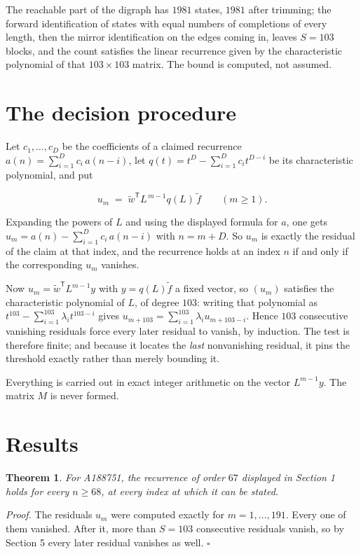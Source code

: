 \documentclass[11pt]{article}
\newtheorem{theorem}{Theorem}
\theoremstyle{definition}
\begin{document}
The reachable part of the digraph has $1981$ states, $1981$ after trimming; the forward identification of states with equal numbers of completions of every length, then the mirror identification on the edges coming in, leaves $S = 103$ blocks, and the count satisfies the linear recurrence given by the characteristic polynomial of that $103\times103$ matrix. The bound is computed, not assumed.

\section{The decision procedure}

Let $c_1,\dots,c_D$ be the coefficients of a claimed recurrence $a(n) = \sum_{i=1}^{D} c_i\,a(n-i)$, let $q(t) = t^{D} - \sum_{i=1}^{D} c_i t^{D-i}$ be its characteristic polynomial, and put

\[u_m \;=\; \tilde w^{\mathsf T} L^{\,m-1} q(L)\,\tilde f \qquad (m \ge 1).\]

Expanding the powers of $L$ and using the displayed formula for $a$, one gets $u_m = a(n) - \sum_{i=1}^{D} c_i\,a(n-i)$ with $n = m + D$. So $u_m$ is exactly the residual of the claim at that index, and the recurrence holds at an index $n$ if and only if the corresponding $u_m$ vanishes.

Now $u_m = \tilde w^{\mathsf T} L^{m-1} y$ with $y = q(L)\tilde f$ a fixed vector, so $(u_m)$ satisfies the characteristic polynomial of $L$, of degree $103$: writing that polynomial as $t^{103} - \sum_{i=1}^{103} \lambda_i t^{103-i}$ gives $u_{m+103} = \sum_{i=1}^{103} \lambda_i u_{m+103-i}$. Hence $103$ consecutive vanishing residuals force every later residual to vanish, by induction. The test is therefore finite; and because it locates the {\itshape last} nonvanishing residual, it pins the threshold exactly rather than merely bounding it.

Everything is carried out in exact integer arithmetic on the vector $L^{m-1}y$. The matrix $M$ is never formed.

\section{Results}

\begin{theorem} For A188751, the recurrence of order $67$ displayed in Section 1 holds for every $n \ge 68$, at every index at which it can be stated.\end{theorem}

{\itshape Proof.} The residuals $u_m$ were computed exactly for $m = 1,\dots,191$. Every one of them vanished. After it, more than $S = 103$ consecutive residuals vanish, so by Section 5 every later residual vanishes as well. $\square$
\end{document}
